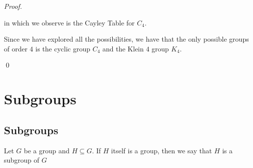 \begin{proof}
\begin{enumerate}
          in which we observe is the Cayley Table for $C_4$.

          Since we have explored all the possibilities, we have that the only possible groups of order $4$ is the cyclic group $C_4$ and the Klein $4$ group $K_4$.
  \end{enumerate}\qed
\end{proof}



\section{Subgroups}
\label{sec:subgroups}

\subsection{Subgroups}
\label{sub:subgroups}

\begin{defn}[Subgroup]\label{defn:subgroup}
  Let $G$ be a group and $H \subseteq G$. If $H$ itself is a group, then we say that $H$ is a subgroup of $G$
\end{defn}



